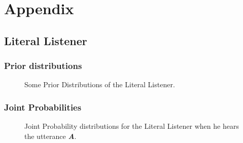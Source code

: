 %
%
\section*{Appendix}
\label{sec:appendix}


\subsection*{Literal Listener}
\label{subsec:appendix-LL}

\subsubsection*{Prior distributions}
\label{subsec:appendix-LL-priors}

\begin{figure}[ht]
\centering
{}\qquad 
{}

\caption{Some Prior Distributions of the Literal Listener.}
\label{fig:LLprior}
\end{figure}

\subsubsection*{Joint Probabilities}
\label{subsec:appendix-LL-tables}

 \begin{figure}[ht]
 \centering
 \subfloat[$A, C$]{\label{fig:LL-uttA-table0}}\qquad
\subfloat[$\neg A, C$]{\label{fig:LL-uttA-table1}}

 \subfloat[$A, \neg C$]{\label{fig:LL-uttA-table2}} \qquad
{}  
 \caption{Joint Probability distributions for the Literal Listener when he hears the utterance \textbf{\textit{A}}.}
 \label{fig:LL-uttA-table}
 \end{figure}


